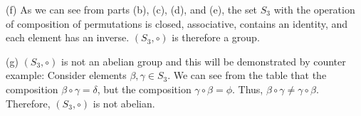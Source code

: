 \documentclass[12pt, a4paper]{article}
\begin{document}
\begin{flushleft}
\begin{flushleft}

\hspace*{10mm}(f) As we can see from parts (b), (c), (d), and (e), the set $S_3$ with the operation of\linebreak
\hspace*{16.7mm}composition of permutations is closed, associative, contains an identity, and 
\hspace*{16.7mm}each element has an inverse. $(S_3, \circ)$ is therefore a group.


\end{flushleft}

\begin{flushleft}

\hspace*{10mm}(g) $(S_3, \circ)$ is not an abelian group and this will be demonstrated by counter 
\hspace*{16.7mm}example: Consider elements $\beta, \gamma \in S_3$. We can see from the table that the\linebreak
\hspace*{16.7mm}composition $\beta \circ \gamma = \delta$, but the composition $\gamma \circ \beta = \phi$. Thus, 
$\beta \circ \gamma \neq \gamma \circ \beta$.\linebreak
\hspace*{16.7mm}Therefore, $(S_3, \circ)$ is not abelian.


\end{flushleft}



\end{flushleft}
\end{document}
